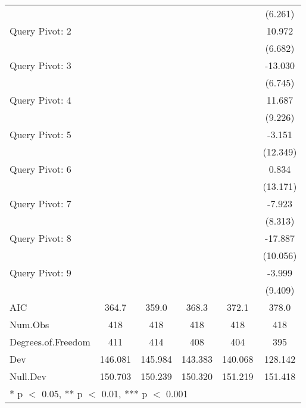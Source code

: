 \begin{table}
\begin{tabular}[t]{lccccc}
 &  &  &  &  & (6.261)\\
Query Pivot: 2 &  &  &  &  & 10.972\\
 &  &  &  &  & (6.682)\\
Query Pivot: 3 &  &  &  &  & -13.030\\
 &  &  &  &  & (6.745)\\
Query Pivot: 4 &  &  &  &  & 11.687\\
 &  &  &  &  & (9.226)\\
Query Pivot: 5 &  &  &  &  & -3.151\\
 &  &  &  &  & (12.349)\\
Query Pivot: 6 &  &  &  &  & 0.834\\
 &  &  &  &  & (13.171)\\
Query Pivot: 7 &  &  &  &  & -7.923\\
 &  &  &  &  & (8.313)\\
Query Pivot: 8 &  &  &  &  & -17.887\\
 &  &  &  &  & (10.056)\\
Query Pivot: 9 &  &  &  &  & -3.999\\
 &  &  &  &  & (9.409)\\
\midrule
AIC & 364.7 & 359.0 & 368.3 & 372.1 & 378.0\\
Num.Obs & 418 & 418 & 418 & 418 & 418\\
Degrees.of.Freedom & 411 & 414 & 408 & 404 & 395\\
Dev & 146.081 & 145.984 & 143.383 & 140.068 & 128.142\\
Null.Dev & 150.703 & 150.239 & 150.320 & 151.219 & 151.418\\
\bottomrule
\multicolumn{6}{l}{\rule{0pt}{1em}* p $<$ 0.05, ** p $<$ 0.01, *** p $<$ 0.001}\\
\end{tabular}
\end{table}
